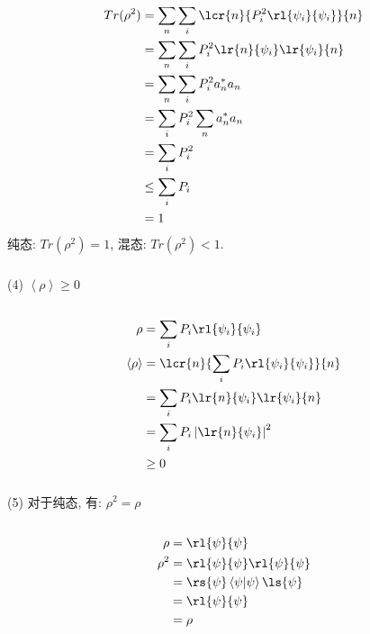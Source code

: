 \begin{frame} 
          \frametitle{}  
    \[ \begin{aligned}
        Tr(\rho^2) &= \sum_n \sum_i \lcr{n}{P^2_i\rl{\psi_i}{\psi_i}}{n} \\
        &= \sum_n \sum_i P^2_i\lr{n}{\psi_i}\lr{\psi_i}{n}  \\
        &= \sum_n \sum_i P^2_i a_n^* a_n \\ 
        &= \sum_i P^2_i \sum_n a_n^* a_n \\ 
        &= \sum_i P^2_i \\ 
        &\leq \sum_i P_i \\ 
        &=1
      \end{aligned}\]
    纯态: $Tr(\rho^2) =1$, 混态: $Tr(\rho^2) < 1$. 
\end{frame}

\begin{frame} 
    \frametitle{}
       (4)  $\left\langle \rho \right\rangle   \geq 0 $ \\ 
       \证~
    \[ \begin{aligned}
        \rho & = \sum_i P_i\rl{\psi_i}{\psi_i} \\ 
        \left\langle \rho \right\rangle &= 
        \lcr{n}{\sum_i P_i\rl{\psi_i}{\psi_i}}{n} \\ 
        &= \sum_i P_i \lr{n}{\psi_i}\lr{\psi_i}{n}  \\
        &= \sum_i P_i \left|\lr{n}{\psi_i} \right|^2 \\
        & \geq 0
      \end{aligned}\]   
   \end{frame}

\begin{frame} 
 \frametitle{}
      (5) 对于纯态, 有: $\rho^2 =\rho$ \\ 
      \证~
      \[ \begin{aligned}
        \rho &= \rl{\psi}{\psi}  \\ 
        \rho^2 &= \rl{\psi}{\psi} \rl{\psi}{\psi} \\ 
        &= \rs{\psi}\left\langle \psi | \psi \right\rangle \ls{\psi} \\ 
        &= \rl{\psi}{\psi}  \\ 
        &=  \rho 
      \end{aligned}\]
\end{frame}

